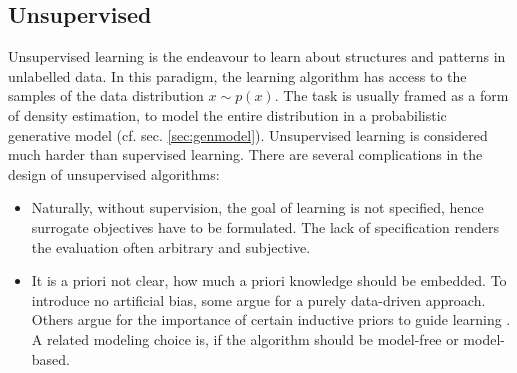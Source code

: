 	\subsection{Unsupervised}\label{sec:unsupervised}
		{Unsupervised learning} is the endeavour to learn about structures and patterns in unlabelled data. In this paradigm, the learning algorithm has access to the samples of the data distribution $x \sim p(x)$. The task is usually framed as a form of density estimation, \ie to model the entire distribution in a probabilistic generative model (cf. sec. \ref{sec:genmodel}).
		Unsupervised learning is considered much harder than supervised learning. There are several complications in the design of unsupervised algorithms:
		\begin{itemize}
			\item Naturally, without supervision, the goal of learning is not specified, hence surrogate objectives have to be formulated. The lack of specification renders the evaluation often arbitrary and subjective.
			\item It is a priori not clear, how much a priori knowledge should be embedded. To introduce no artificial bias, some argue for a purely data-driven approach. Others argue for the importance of certain inductive priors to guide learning \cite{tenenbaum18think}. A related modeling choice is, if the algorithm should be model-free or model-based. 
		\end{itemize}

